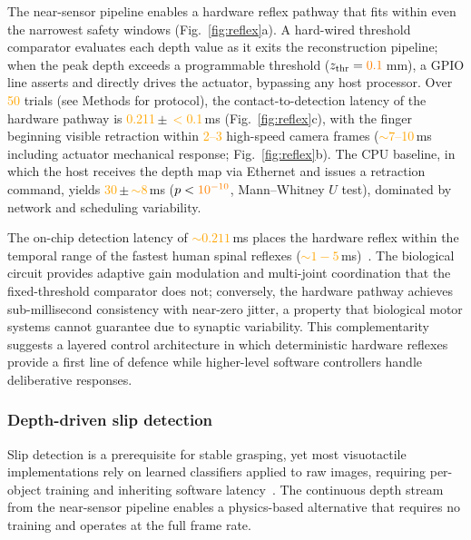 \documentclass[10pt,a4paper]{article}
\newcommand{\placeholder}[1]{\textcolor{orange}{#1}}
\newcommand{\reflexFPGA}{\placeholder{0.211}}           %
\newcommand{\reflexCPU}{\placeholder{30}}             %
\begin{document}
The near-sensor pipeline enables a hardware reflex pathway that fits within even the narrowest safety windows (Fig.~\ref{fig:reflex}a). A hard-wired threshold comparator evaluates each depth value as it exits the reconstruction pipeline; when the peak depth exceeds a programmable threshold ($z_\mathrm{thr} = \placeholder{0.1}$\,mm), a GPIO line asserts and directly drives the actuator, bypassing any host processor. Over \placeholder{50} trials (see Methods for protocol), the contact-to-detection latency of the hardware pathway is \reflexFPGA\,$\pm$\,\placeholder{$<$0.1}\,ms (Fig.~\ref{fig:reflex}c), with the finger beginning visible retraction within \placeholder{2--3} high-speed camera frames (\placeholder{${\sim}7$--10}\,ms including actuator mechanical response; Fig.~\ref{fig:reflex}b). The CPU baseline, in which the host receives the depth map via Ethernet and issues a retraction command, yields \reflexCPU\,$\pm$\,\placeholder{${\sim}8$}\,ms ($p < \placeholder{10^{-10}}$, Mann--Whitney $U$ test), dominated by network and scheduling variability.

The on-chip detection latency of \placeholder{${\sim}0.211$}\,ms places the hardware reflex within the temporal range of the fastest human spinal reflexes (\placeholder{${\sim}1{-}5$}\,ms)~\cite{johansson1984tactile}. The biological circuit provides adaptive gain modulation and multi-joint coordination that the fixed-threshold comparator does not; conversely, the hardware pathway achieves sub-millisecond consistency with near-zero jitter, a property that biological motor systems cannot guarantee due to synaptic variability. This complementarity suggests a layered control architecture in which deterministic hardware reflexes provide a first line of defence while higher-level software controllers handle deliberative responses.

\subsubsection*{Depth-driven slip detection}

Slip detection is a prerequisite for stable grasping, yet most visuotactile implementations rely on learned classifiers applied to raw images, requiring per-object training and inheriting software latency~\cite{dong2017improved}. The continuous depth stream from the near-sensor pipeline enables a physics-based alternative that requires no training and operates at the full frame rate.
\end{document}
